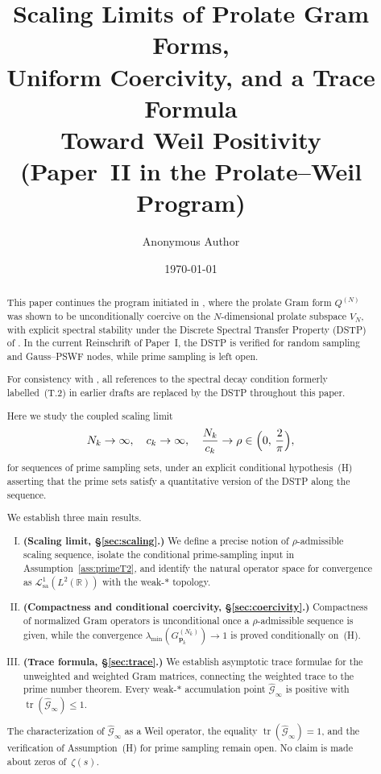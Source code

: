 \documentclass[12pt,a4paper]{amsart}
\title[Scaling Limits, Uniform Coercivity, and Trace Formula]
{Scaling Limits of Prolate Gram Forms,\\
Uniform Coercivity, and a Trace Formula\\
Toward Weil Positivity\\[4pt]
\large (Paper~II in the Prolate--Weil Program)}
\author{Anonymous Author}
\date{\today}
\theoremstyle{definition}
\newcommand{\GVMk}{G^{(N_k)}_{\mathbf{p}_k}}
\newcommand{\Lcal}{\mathcal{L}^1_{\mathrm{sa}}}
\newcommand{\Gcal}{\widehat{\mathcal{G}}}
\begin{document}
\begin{abstract}
This paper continues the program initiated in \cite{PaperI}, where the
prolate Gram form $Q^{(N)}$ was shown to be unconditionally coercive on
the $N$-dimensional prolate subspace $V_N$, with explicit spectral
stability under the Discrete Spectral Transfer Property (DSTP)
of \cite{PaperI}.
In the current Reinschrift of Paper~I, the DSTP is verified
for random sampling and Gauss--PSWF nodes, while prime sampling is left open.

For consistency with \cite{PaperI}, all references to the spectral decay
condition formerly labelled~(T.2) in earlier drafts are replaced by the
DSTP throughout this paper.

Here we study the coupled scaling limit
\[
  N_k \to \infty,\quad c_k \to \infty,\quad
  \frac{N_k}{c_k} \to \rho \in \Bigl(0,\,\frac{2}{\pi}\Bigr),
\]
for sequences of prime sampling sets, under an explicit conditional
hypothesis~\textup{(H)} asserting that the prime sets satisfy a quantitative
version of the DSTP along the sequence.

We establish three main results.
\begin{enumerate}[(I)]
\item \textbf{(Scaling limit, \S\ref{sec:scaling}.)} We define a precise notion of
$\rho$-admissible scaling sequence, isolate the conditional prime-sampling
input in Assumption~\ref{ass:primeT2}, and identify the natural operator
space for convergence as $\Lcal(L^2(\mathbb{R}))$ with the weak-$*$ topology.
\item \textbf{(Compactness and conditional coercivity, \S\ref{sec:coercivity}.)}
Compactness of normalized Gram operators is unconditional once a
$\rho$-admissible sequence is given, while the convergence
$\lambda_{\min}(\GVMk)\to1$ is proved conditionally on~\textup{(H)}.
\item \textbf{(Trace formula, \S\ref{sec:trace}.)} We establish asymptotic trace
formulae for the unweighted and weighted Gram matrices, connecting the
weighted trace to the prime number theorem. Every weak-$*$ accumulation point
$\Gcal_\infty$ is positive with $\operatorname{tr}(\Gcal_\infty)\leq1$.
\end{enumerate}
The characterization of $\Gcal_\infty$ as a Weil operator, the equality
$\operatorname{tr}(\Gcal_\infty)=1$, and the verification of Assumption~\textup{(H)}
for prime sampling remain open.
No claim is made about zeros of~$\zeta(s)$.
\end{abstract}
\end{document}
